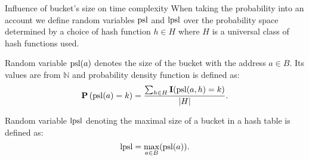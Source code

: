 \begin{section}{Influence of bucket's size on time complexity}
When taking the probability into an account we define random variables $\mathrm{psl}$ and $\mathrm{lpsl}$ over the probability space determined by a choice of hash function $h \in H$ where $H$ is a universal class of hash functions used.

\begin{definition}
Random variable $\mathrm{psl}(a)$ denotes the size of the bucket with the address $a \in B$. Its values are from $\mathbb{N}$ and probability density function is defined as:
\[
\mathbf{P}\left(\mathrm{psl}(a) = k\right) = \frac{\sum_{h \in H} \mathbf{I}(\mathrm{psl}(a, h) = k)}{|H|}\text{.}
\]

Random variable $\mathrm{lpsl}$ denoting the maximal size of a bucket in a hash table is defined as:
\[
\mathrm{lpsl} = \displaystyle\max_{a \in B}(\mathrm{psl}(a))\text{.}
\]
\end{definition}
\end{section}

